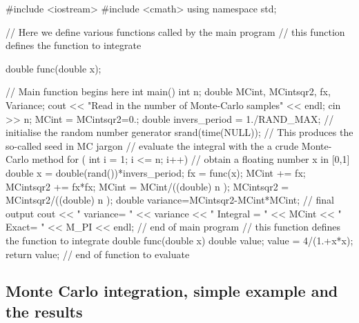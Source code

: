 \documentclass[%
oneside,                 %
final,                   %
10pt]{article}
\newenvironment{block_mdfboxadmon}[1][]{
\begin{block_mdfboxmdframed}[frametitle=#1]
}
{
\end{block_mdfboxmdframed}
}
\begin{document}
\begin{block_mdfboxadmon}[]
\bcppcod
#include <iostream>
#include <cmath>
using namespace std;

//     Here we define various functions called by the main program  
//     this function defines the function to integrate  

double func(double x);

//     Main function begins here     
int main()
{
     int n;
     double MCint, MCintsqr2, fx, Variance; 
     cout << "Read in the number of Monte-Carlo samples" << endl;
     cin >> n;
     MCint = MCintsqr2=0.;
     double invers_period = 1./RAND_MAX; // initialise the random number generator
     srand(time(NULL));  // This produces the so-called seed in MC jargon
//   evaluate the integral with the a crude Monte-Carlo method    
     for ( int i = 1;  i <= n; i++){
  // obtain a floating number x in [0,1]
           double x = double(rand())*invers_period; 
           fx = func(x);
           MCint += fx;
           MCintsqr2 += fx*fx;
     }
     MCint = MCint/((double) n );
     MCintsqr2 = MCintsqr2/((double) n );
     double variance=MCintsqr2-MCint*MCint;
//   final output 
     cout << " variance= " << variance << " Integral = " << MCint << " Exact= " << M_PI << endl;
}  // end of main program 
// this function defines the function to integrate 
double func(double x)
{
  double value;
  value = 4/(1.+x*x);
  return value;
} // end of function to evaluate 
\ecppcod
\end{block_mdfboxadmon} %




\subsection{Monte Carlo integration, simple  example and the results}
\end{document}
